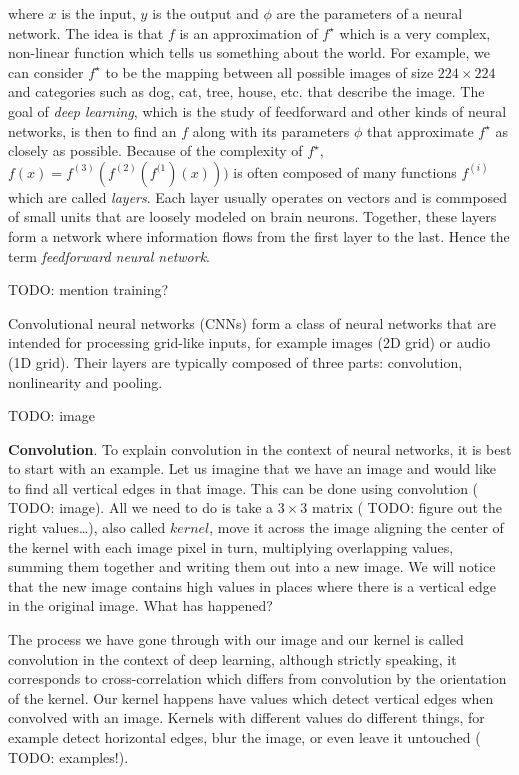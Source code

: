 where \(x\) is the input, \(y\) is the output and \(\phi\) are the parameters of a neural network. The idea is that \(f\) is an approximation of \(f^\star\) which is a very complex, non-linear function which tells us something about the world. For example, we can consider \(f^\star\) to be the mapping between all possible images of size \(224 \times 224\) and categories such as dog, cat, tree, house, etc. that describe the image. The goal of \textit{deep learning}, which is the study of feedforward and other kinds of neural networks, is then to find an \(f\) along with its parameters \(\phi\) that approximate \(f^\star\) as closely as possible. Because of the complexity of \(f^\star\), \(f(x) = f^{(3)}(f^{(2)}(f^{(1})(x)))\) is often composed of many functions \(f^{(i)}\) which are called \textit{layers}. Each layer usually operates on vectors and is commposed of small units that are loosely modeled on brain neurons. Together, these layers form a network where information flows from the first layer to the last. Hence the term \textit{feedforward neural network}.

{\color{red} TODO: mention training?}

Convolutional neural networks (CNNs) form a class of neural networks that are intended for processing grid-like inputs, for example images (2D grid) or audio (1D grid). Their layers are typically composed of three parts: convolution, nonlinearity and pooling.

{\color{red} TODO: image}

\textbf{Convolution}. To explain convolution in the context of neural networks, it is best to start with an example. Let us imagine that we have an image and would like to find all vertical edges in that image. This can be done using convolution ({\color{red} TODO: image}). All we need to do is take a \(3 \times 3\) matrix ({\color{red} TODO: figure out the right values\dots}), also called \(kernel\), move it across the image aligning the center of the kernel with each image pixel in turn, multiplying overlapping values, summing them together and writing them out into a new image. We will notice that the new image contains high values in places where there is a vertical edge in the original image. What has happened?

The process we have gone through with our image and our kernel is called convolution in the context of deep learning, although strictly speaking, it corresponds to cross-correlation which differs from convolution by the orientation of the kernel. Our kernel happens have values which detect vertical edges when convolved with an image. Kernels with different values do different things, for example detect horizontal edges, blur the image, or even leave it untouched ({\color{red} TODO: examples!}).

